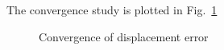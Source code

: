 The convergence study is plotted in Fig.~\ref{oct_fig:ex_hollow_sphere_conv}
\begin{figure}[h!]
    \centering
    \caption{Convergence of displacement error}
    \label{oct_fig:ex_hollow_sphere_conv}
  \end{figure}